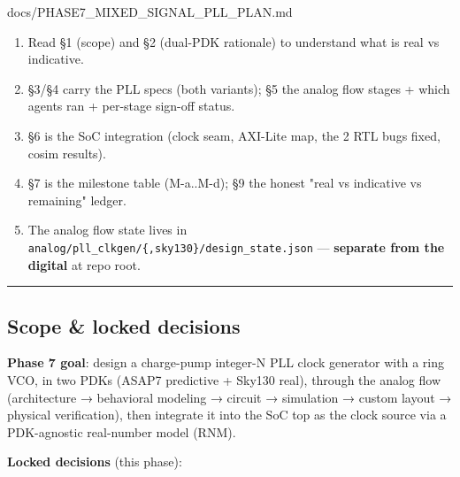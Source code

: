 \begin{relocated}{docs/PHASE7_MIXED_SIGNAL_PLL_PLAN.md}
\begin{enumerate}
\def\labelenumi{\arabic{enumi}.}
\tightlist
\item
  Read §1 (scope) and §2 (dual-PDK rationale) to understand what is real
  vs indicative.
\item
  §3/§4 carry the PLL specs (both variants); §5 the analog flow stages +
  which agents ran + per-stage sign-off status.
\item
  §6 is the SoC integration (clock seam, AXI-Lite map, the 2 RTL bugs
  fixed, cosim results).
\item
  §7 is the milestone table (M-a..M-d); §9 the honest "real vs
  indicative vs remaining" ledger.
\item
  The analog flow state lives in
  \texttt{analog/\allowbreak{}pll\_\allowbreak{}clkgen/\allowbreak{}\{,\allowbreak{}sky130\}/\allowbreak{}design\_\allowbreak{}state.\allowbreak{}json}
  --- \textbf{separate from the digital } at repo
  root.
\end{enumerate}

\begin{center}\rule{0.5\linewidth}{0.5pt}\end{center}

\subsection{Scope \& locked decisions}\label{ds:ch:phase7-pll-plan:1-scope-locked-decisions}

\textbf{Phase 7 goal}: design a charge-pump integer-N PLL clock
generator with a ring VCO, in two PDKs (ASAP7 predictive + Sky130 real),
through the analog flow (architecture → behavioral modeling → circuit →
simulation → custom layout → physical verification), then integrate it
into the SoC top as the clock source via a PDK-agnostic real-number
model (RNM).

\textbf{Locked decisions} (this phase):

{\footnotesize\setlength{\tabcolsep}{3pt}

}
\end{relocated}
